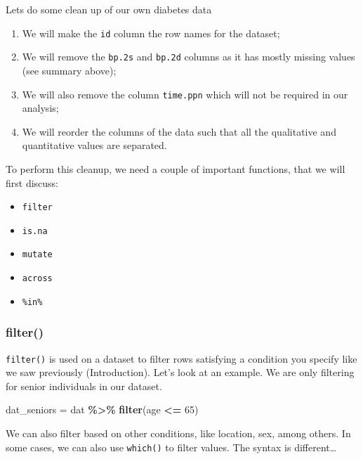 \documentclass[
]{book}
\newenvironment{Shaded}{\begin{snugshade}}{\end{snugshade}}
\newcommand{\DecValTok}[1]{\textcolor[rgb]{0.00,0.00,0.81}{#1}}
\newcommand{\FunctionTok}[1]{\textcolor[rgb]{0.13,0.29,0.53}{\textbf{#1}}}
\newcommand{\NormalTok}[1]{#1}
\newcommand{\OtherTok}[1]{\textcolor[rgb]{0.56,0.35,0.01}{#1}}
\newcommand{\SpecialCharTok}[1]{\textcolor[rgb]{0.81,0.36,0.00}{\textbf{#1}}}
\providecommand{\tightlist}{%
  \setlength{\itemsep}{0pt}\setlength{\parskip}{0pt}}
\begin{document}
Lets do some clean up of our own diabetes data

\begin{enumerate}
\def\labelenumi{\arabic{enumi}.}
\tightlist
\item
  We will make the \texttt{id} column the row names for the dataset;
\item
  We will remove the \texttt{bp.2s} and \texttt{bp.2d} columns as it has mostly missing values (see summary above);
\item
  We will also remove the column \texttt{time.ppn} which will not be required in our analysis;
\item
  We will reorder the columns of the data such that all the qualitative and quantitative values are separated.
\end{enumerate}

To perform this cleanup, we need a couple of important functions, that we will first discuss:

\begin{itemize}
\tightlist
\item
  \texttt{filter}
\item
  \texttt{is.na}
\item
  \texttt{mutate}
\item
  \texttt{across}
\item
  \texttt{\%in\%}
\end{itemize}

\hypertarget{filter}{%
\subsubsection{filter()}\label{filter}}

\texttt{filter()} is used on a dataset to filter rows satisfying a condition you specify like we saw previously (Introduction).
Let's look at an example. We are only filtering for senior individuals in our dataset.

\begin{Shaded}
\begin{Highlighting}[]
\NormalTok{dat\_seniors }\OtherTok{=}\NormalTok{ dat }\SpecialCharTok{\%\textgreater{}\%}
  \FunctionTok{filter}\NormalTok{(age }\SpecialCharTok{\textless{}=} \DecValTok{65}\NormalTok{)}
\end{Highlighting}
\end{Shaded}

We can also filter based on other conditions, like location, sex, among others.
In some cases, we can also use \texttt{which()} to filter values. The syntax is different\ldots{}
\end{document}
